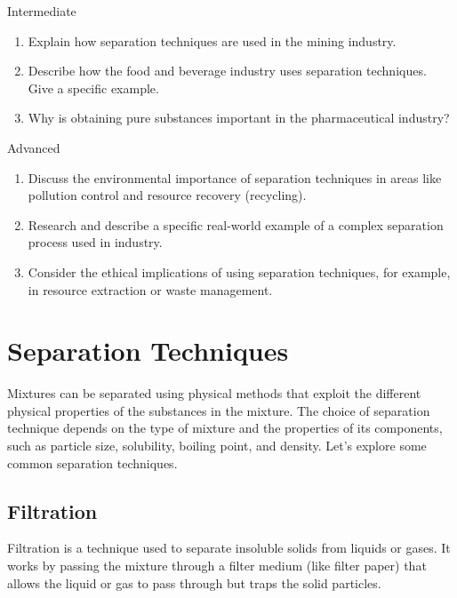 \begin{tieredquestions}{Intermediate}
\begin{enumerate}
    \item Explain how separation techniques are used in the mining industry.
    \item Describe how the food and beverage industry uses separation techniques. Give a specific example.
    \item  Why is obtaining pure substances important in the pharmaceutical industry?
\end{enumerate}
\end{tieredquestions}

\begin{tieredquestions}{Advanced}
\begin{enumerate}
    \item  Discuss the environmental importance of separation techniques in areas like pollution control and resource recovery (recycling).
    \item  Research and describe a specific real-world example of a complex separation process used in industry.
    \item  Consider the ethical implications of using separation techniques, for example, in resource extraction or waste management.
\end{enumerate}
\end{tieredquestions}


\section{Separation Techniques}

Mixtures can be separated using physical methods that exploit the different physical properties of the substances in the mixture. The choice of separation technique depends on the type of mixture and the properties of its components, such as particle size, solubility, boiling point, and density. Let's explore some common separation techniques.


\subsection{Filtration}

\begin{keyconcept}{Filtration}
 is a technique used to separate insoluble solids from liquids or gases. It works by passing the mixture through a filter medium (like filter paper) that allows the liquid or gas to pass through but traps the solid particles.
\end{keyconcept}

